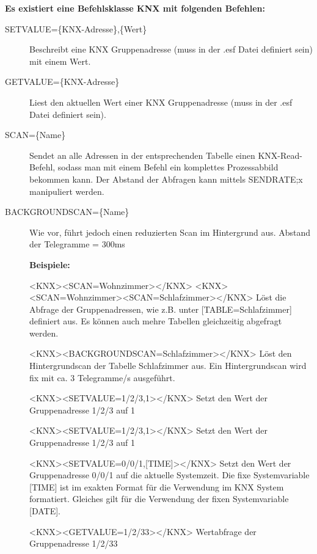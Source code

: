 \documentclass[letterpaper,10pt,english]{sphinxmanual}
\begin{document}
\textbf{Es existiert eine Befehlsklasse KNX mit folgenden Befehlen:}
\begin{description}
\item[{SETVALUE=\{KNX-Adresse\},\{Wert\}}] \leavevmode
Beschreibt eine KNX Gruppenadresse (muss in der .esf Datei definiert sein) mit einem Wert.

\item[{GETVALUE=\{KNX-Adresse\}}] \leavevmode
Liest den aktuellen Wert einer KNX Gruppenadresse (muss in der .esf Datei definiert sein).

\item[{SCAN=\{Name\}}] \leavevmode
Sendet an alle Adressen in der entsprechenden Tabelle einen KNX-Read-Befehl, sodass man mit einem Befehl ein komplettes Prozessabbild bekommen kann. Der Abstand der Abfragen kann mittels SENDRATE;x manipuliert werden.

\item[{BACKGROUNDSCAN=\{Name\}}] \leavevmode
Wie vor, führt jedoch einen reduzierten Scan im Hintergrund aus. Abstand der Telegramme = 300ms

\textbf{Beispiele:}

\textless{}KNX\textgreater{}\textless{}SCAN=Wohnzimmer\textgreater{}\textless{}/KNX\textgreater{}
\textless{}KNX\textgreater{}\textless{}SCAN=Wohnzimmer\textgreater{}\textless{}SCAN=Schlafzimmer\textgreater{}\textless{}/KNX\textgreater{}
Löst die Abfrage der Gruppenadressen, wie z.B. unter {[}TABLE=Schlafzimmer{]} definiert aus. Es können auch mehre Tabellen gleichzeitig abgefragt werden.

\textless{}KNX\textgreater{}\textless{}BACKGROUNDSCAN=Schlafzimmer\textgreater{}\textless{}/KNX\textgreater{}
Löst den Hintergrundscan der Tabelle Schlafzimmer aus. Ein Hintergrundscan wird fix mit ca. 3 Telegramme/s ausgeführt.

\textless{}KNX\textgreater{}\textless{}SETVALUE=1/2/3,1\textgreater{}\textless{}/KNX\textgreater{}
Setzt den Wert der Gruppenadresse 1/2/3 auf 1

\textless{}KNX\textgreater{}\textless{}SETVALUE=1/2/3,1\textgreater{}\textless{}/KNX\textgreater{}
Setzt den Wert der Gruppenadresse 1/2/3 auf 1

\textless{}KNX\textgreater{}\textless{}SETVALUE=0/0/1,{[}TIME{]}\textgreater{}\textless{}/KNX\textgreater{}
Setzt den Wert der Gruppenadresse 0/0/1 auf die aktuelle Systemzeit. Die fixe Systemvariable {[}TIME{]} ist im exakten Format für die Verwendung im KNX System formatiert. Gleiches gilt für die Verwendung der fixen Systemvariable {[}DATE{]}.

\textless{}KNX\textgreater{}\textless{}GETVALUE=1/2/33\textgreater{}\textless{}/KNX\textgreater{}
Wertabfrage der Gruppenadresse 1/2/33

\end{description}
\end{document}

